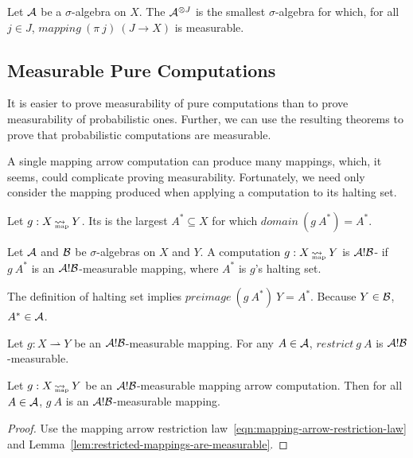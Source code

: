 \documentclass[preprint]{sigplanconf}
\newcommand{\arrow}{\rightsquigarrow}
\newcommand{\pto}{\rightharpoonup}
\newcommand{\map}{_\mathrm{map}}
\DeclareMathOperator{\mapto}{\arrow_{\mspace{-21mu}\map}}
\begin{document}
\begin{definition}
Let $\mathcal{A}$ be a $\sigma$-algebra on $X$.
The  $\mathcal{A}^{\otimes J}$ is the smallest $\sigma$-algebra for which, for all $j \in J$, $mapping~(\pi~j)~(J \to X)$ is measurable.
\label{def:arbitrary-product-sigma-algebra}
\end{definition}

\subsection{Measurable Pure Computations}

It is easier to prove measurability of pure computations than to prove measurability of probabilistic ones.
Further, we can use the resulting theorems to prove that probabilistic computations are measurable.

A single mapping arrow computation can produce many mappings, which, it seems, could complicate proving measurability.
Fortunately, we need only consider the mapping produced when applying a computation to its halting set.

\begin{definition}
Let $g : X \mapto Y$. Its  is the largest $A^* \subseteq X$ for which $domain~(g~A^*) = A^*$.
\end{definition}

\begin{definition}
Let $\mathcal{A}$ and $\mathcal{B}$ be $\sigma$-algebras on $X$ and $Y$.
A computation $g : X \mapto Y$ is $\mathcal{A}!\mathcal{B}$- if $g~A^*$ is an $\mathcal{A}!\mathcal{B}$-measurable mapping, where $A^*$ is $g$'s halting set.
\end{definition}

The definition of halting set implies $preimage~(g~A^*)~Y = A^*$.
Because $Y \in \mathcal{B}$, $A^* \in \mathcal{A}$.

\begin{lemma}
Let $g : X \pto Y$ be an $\mathcal{A}!\mathcal{B}$-measurable mapping.
For any $A \in \mathcal{A}$, $restrict~g~A$ is $\mathcal{A}!\mathcal{B}$-measurable.
\label{lem:restricted-mappings-are-measurable}
\end{lemma}

\begin{theorem}
Let $g : X \mapto Y$ be an $\mathcal{A}!\mathcal{B}$-measurable mapping arrow computation.
Then for all $A \in \mathcal{A}$, $g~A$ is an $\mathcal{A}!\mathcal{B}$-measurable mapping.
\label{thm:restricted-computations-are-measurable}
\end{theorem}
\begin{proof}
Use the mapping arrow restriction law~\eqref{eqn:mapping-arrow-restriction-law} and Lemma~\ref{lem:restricted-mappings-are-measurable}.
\end{proof}
\end{document}
